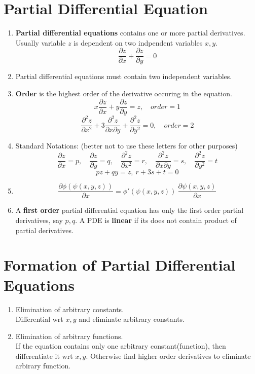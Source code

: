 \section{Partial Differential Equation}
\begin{enumerate}
	\item \textbf{Partial differential equations} contains one or more partial derivatives. Usually variable $z$ is dependent on two indpendent variables $x,y$.
		$$ \frac{\partial z}{\partial x} + \frac{\partial z}{\partial y} = 0$$
	\item Partial differential equations must contain two independent variables.
	\item \textbf{Order} is the highest order of the derivative occuring in the equation.
		$$ x\frac{\partial z}{\partial x} + y \frac{\partial z}{\partial y} = z,\quad order = 1$$
		$$ \frac{\partial ^2z}{\partial x^2} + 3\frac{\partial^2 z}{\partial x \partial y} + \frac{\partial^2 z}{\partial y^2} = 0, \quad order = 2$$
	\item Standard Notations: (better not to use these letters for other purposes)
		$$ \frac{\partial z}{\partial x} = p,\quad \frac{\partial z}{\partial y} = q,\quad \frac{\partial^2 z}{\partial x^2} = r,\quad \frac{\partial^2 z}{\partial x \partial y} = s,\quad \frac{\partial^2 z}{\partial y^2} = t$$
		$$ pz+qy = z,\ r+3s+t = 0$$
	\item $$ \frac{\partial \phi(\psi(x,y,z))}{\partial x} = \phi'(\psi(x,y,z))\ \frac{\partial \psi(x,y,z)}{\partial x} $$
	\item A \textbf{first order} partial differential equation has only the first order partial derivatives, say $p,q$. A PDE is \textbf{linear} if its does not contain product of partial derivatives.
\end{enumerate}

\section{Formation of Partial Differential Equations}
\begin{enumerate}
	\item Elimination of arbitrary constants.\\
		Differential wrt $x,y$ and eliminate arbitrary constants.
	\item Elimination of arbitrary functions.\\
		If the equation contains only one arbitrary constant(function), then differentiate it wrt $x,y$. Otherwise find higher order derivatives to eliminate arbirary function.
\end{enumerate}

